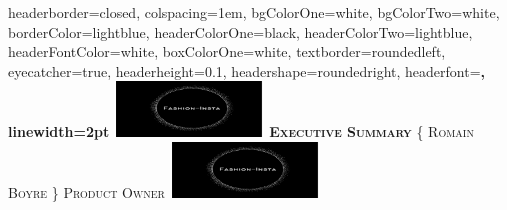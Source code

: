 \documentclass[landscape,a0paper,fontscale=0.285]{baposter} %
\begin{document}
\begin{poster}
{
headerborder=closed, %
colspacing=1em, %
bgColorOne=white, %
bgColorTwo=white, %
borderColor=lightblue, %
headerColorOne=black, %
headerColorTwo=lightblue, %
headerFontColor=white, %
boxColorOne=white, %
textborder=roundedleft, %
eyecatcher=true, %
headerheight=0.1\textheight, %
headershape=roundedright, %
headerfont=\Large\bf\textsc, %
linewidth=2pt %
}
%
{\includegraphics[height=4em]{logo_16_9.png}} %
{\bf\textsc{Executive Summary}\vspace{0.5em}} %
{\textsc{\{ Romain Boyre \} \hspace{12pt} Product Owner}} %
{\includegraphics[height=4em]{logo_16_9.png}} %



\end{poster}
\end{document}
